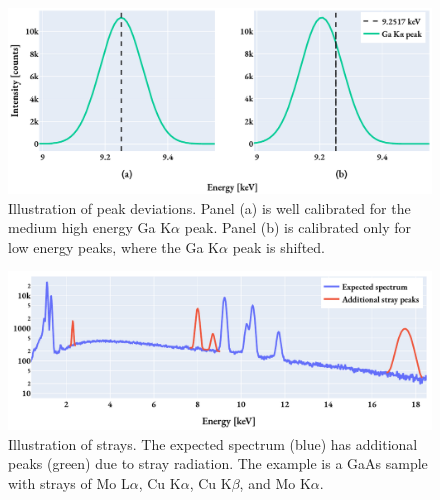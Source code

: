 \begin{figure}[htp]
    \centering
    \includegraphics[width=0.95\linewidth]{figures/pp_peak_deviation.pdf}
    \caption{
        Illustration of peak deviations.
        Panel (a) is well calibrated for the medium high energy Ga K$\alpha$ peak.
        Panel (b) is calibrated only for low energy peaks, where the Ga K$\alpha$ peak is shifted.
    }
    \label{fig:theory:eds_performance:overview:peak_deviations}
\end{figure}

\begin{figure}[htp]
    \centering
    \includegraphics[width=0.95\linewidth]{figures/pp_strays.pdf}
    \caption{
        Illustration of strays.
        The expected spectrum (blue) has additional peaks (green) due to stray radiation.
        The example is a GaAs sample with strays of Mo L$\alpha$, Cu K$\alpha$, Cu K$\beta$, and Mo K$\alpha$.
    }
    \label{fig:theory:eds_performance:overview:strays}
\end{figure}




